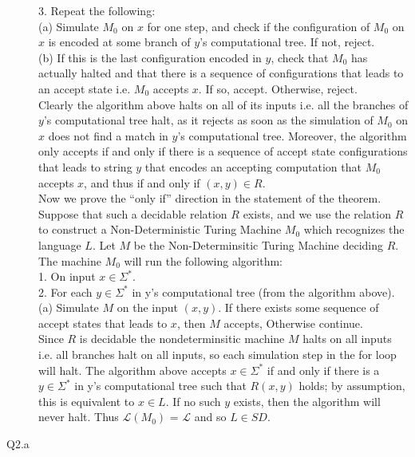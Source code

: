 \documentclass{csc_assignment}
\begin{document}
\begin{description}
3. Repeat the following:\\
(a) Simulate $M_0$ on $x$ for one step, and check if the configuration of $M_0$ on $x$ is encoded at some branch of $y$'s computational tree. If not, reject.\\
(b) If this is the last configuration encoded in $y$, check that $M_0$ has actually halted and
that there is a sequence of configurations that leads to an accept state i.e. $M_{0}$ accepts $x$. If so, accept. Otherwise, reject.\\
Clearly the algorithm above halts on all of its inputs i.e. all the branches of $y$'s computational tree halt, as it rejects as soon as the simulation of $M_0$ on $x$ does not find a match in $y$'s computational tree. Moreover, the algorithm only accepts if and only if there is a sequence of accept state configurations that leads to  string $y$ that encodes an accepting computation that $M_0$ accepts $x$, and thus if and only if $(x, y) \in R$.\\[2pt]
Now we prove the ``only if'' direction in the statement of the theorem. Suppose that such a decidable relation $R$ exists, and we use the relation $R$ to construct a Non-Deterministic Turing Machine $M_0$ which recognizes the language $L$. Let $M$ be the Non-Determinsitic Turing Machine deciding $R$. \\ The machine $M_0$ will run the following algorithm:\\
1. On input $x \in \Sigma^*$.\\
2. For each $y \in \Sigma^*$ in y's computational tree (from the algorithm above).\\
(a) Simulate $M$ on the input $(x, y)$. If there exists some sequence of accept states that leads to $x$, then $M$ accepts, Otherwise continue.\\ Since $R$ is decidable the nondeterminsitic machine $M$ halts on all inputs i.e. all branches halt on all inputs, so each simulation step in the for loop will halt. The algorithm above accepts $x \in \Sigma^*$ if and only if there is a $y \in \Sigma^*$ in y's computational tree such that $R(x, y)$ holds; by assumption, this is equivalent to $x \in L$. If no such $y$ exists, then the algorithm will never halt. Thus $\mathcal{L}(M_0)$ = $\mathcal{L}$ and so $L \in SD$.


\item[Q2.a]


\end{description}
\end{document}
